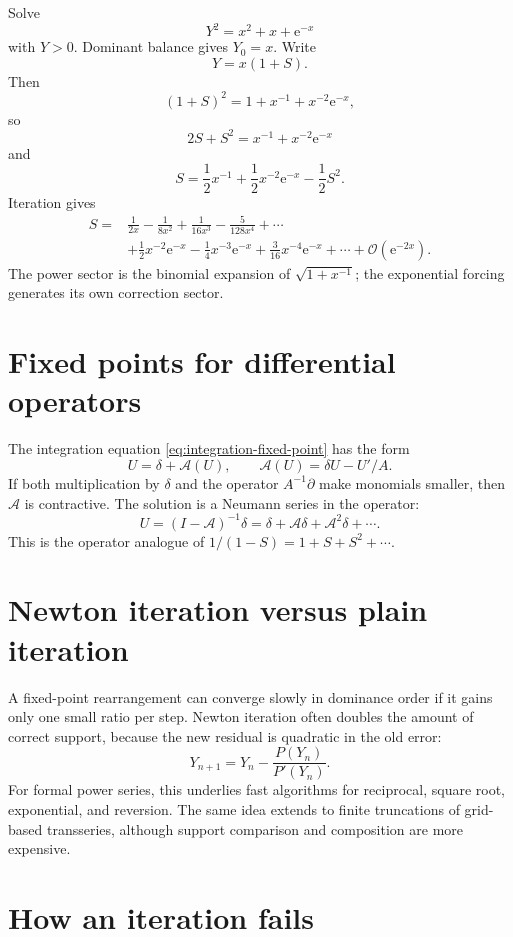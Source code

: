 \documentclass[11pt,openany]{book}
\theoremstyle{definition}
\theoremstyle{plain}
\theoremstyle{remark}
\newcommand{\e}{\mathrm{e}}
\newcommand{\bigO}{\mathcal{O}}
\begin{document}
Solve
\[
 Y^2=x^2+x+\e^{-x}
\]
with $Y>0$. Dominant balance gives $Y_0=x$. Write
\[
 Y=x(1+S).
\]
Then
\[
 (1+S)^2=1+x^{-1}+x^{-2}\e^{-x},
\]
so
\[
 2S+S^2=x^{-1}+x^{-2}\e^{-x}
\]
and
\begin{equation}\label{eq:sqrt-fixed}
 S=\frac12x^{-1}+\frac12x^{-2}\e^{-x}-\frac12S^2.
\end{equation}
Iteration gives
\begin{align*}
 S={}&\frac1{2x}-\frac1{8x^2}+\frac1{16x^3}
 -\frac5{128x^4}+\cdots\\
 &+\frac12x^{-2}\e^{-x}
 -\frac14x^{-3}\e^{-x}
 +\frac3{16}x^{-4}\e^{-x}+\cdots
 +\bigO(\e^{-2x}).
\end{align*}
The power sector is the binomial expansion of $\sqrt{1+x^{-1}}$; the exponential forcing generates its own correction sector.

\section{Fixed points for differential operators}

The integration equation \cref{eq:integration-fixed-point} has the form
\[
 U=\delta+\mathcal{A}(U),
 \qquad
 \mathcal{A}(U)=\delta U-U'/A.
\]
If both multiplication by $\delta$ and the operator $A^{-1}\partial$ make monomials smaller, then $\mathcal{A}$ is contractive. The solution is a Neumann series in the operator:
\[
 U=(I-\mathcal{A})^{-1}\delta
 =\delta+\mathcal{A}\delta+\mathcal{A}^2\delta+\cdots.
\]
This is the operator analogue of $1/(1-S)=1+S+S^2+\cdots$.

\section{Newton iteration versus plain iteration}

A fixed-point rearrangement can converge slowly in dominance order if it gains only one small ratio per step. Newton iteration often doubles the amount of correct support, because the new residual is quadratic in the old error:
\[
 Y_{n+1}=Y_n-\frac{P(Y_n)}{P'(Y_n)}.
\]
For formal power series, this underlies fast algorithms for reciprocal, square root, exponential, and reversion. The same idea extends to finite truncations of grid-based transseries, although support comparison and composition are more expensive.

\section{How an iteration fails}
\end{document}
